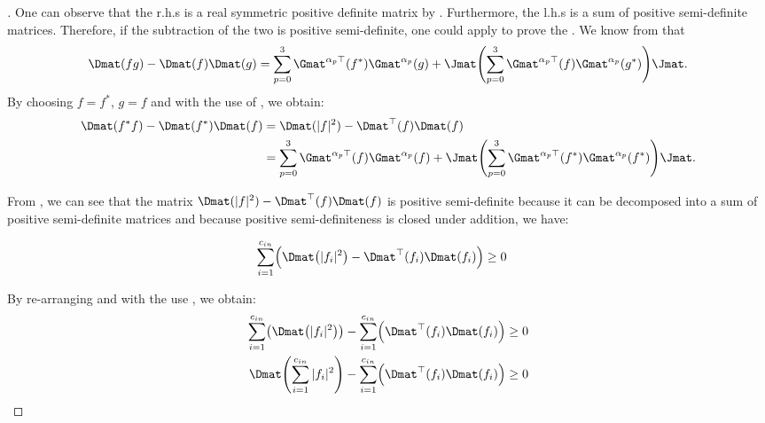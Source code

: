 \begin{proof}[]
\noindent
One can observe that the r.h.s is a real symmetric positive definite matrix by . Furthermore, the l.h.s is a sum of positive semi-definite matrices. Therefore, if the subtraction of the two is positive semi-definite, one could apply  to prove the . 
We know from  that 
\begin{equation}
    \Dmat(fg) - \Dmat(f)\Dmat(g) = \sum_{p=0}^3 \Gmat^{\alpha_p \top}(f^*) \Gmat^{\alpha_p}(g) + \Jmat \left( \sum_{p=0}^3 \Gmat^{\alpha_p \top}(f) \Gmat^{\alpha_p}(g^*) \right) \Jmat.
\end{equation}
By choosing $f = f^*$, $g = f$ and with the use of , we obtain:
\begin{align} \label{equation:widom_identity_block_topelitz}
  \Dmat(f^* f) - \Dmat(f^*)\Dmat(f)
  &= \Dmat(|f|^2) - \Dmat^{\top}(f)\Dmat(f) \\
  &= \sum_{p=0}^3 \Gmat^{\alpha_p \top}(f)\Gmat^{\alpha_p}(f) + \Jmat \left( \sum_{p=0}^3 \Gmat^{\alpha_p \top}(f^*)\Gmat^{\alpha_p} (f^*) \right) \Jmat .
\end{align}

\noindent
From , we can see that the matrix $\Dmat(|f|^2) - \Dmat^{\top}(f)\Dmat(f)$
is positive semi-definite because it can be decomposed into a sum of positive semi-definite matrices and because positive semi-definiteness is closed under addition, we have:

\begin{align}
    \sum_{i=1}^{\cin} \leftmat \Dmat \left( |f_i|^2 \right) - \Dmat^{\top} \left(f_i \right) \Dmat (f_i) \rightmat &\geq 0
\end{align}

\noindent
By re-arranging and with the use , we obtain:
\begin{align}
   \sum_{i=1}^{\cin} \leftmat \Dmat \left( |f_i|^2 \right) \rightmat - \sum_{i=1}^{\cin} \leftmat \Dmat^{\top} \left(f_i \right) \Dmat (f_i) \rightmat &\geq 0 \\
    \Dmat \left( \sum_{i=1}^{\cin} |f_i|^2 \right) - \sum_{i=1}^{\cin} \leftmat \Dmat^{\top} \left(f_i \right) \Dmat (f_i) \rightmat &\geq 0
\end{align}


\end{proof}
